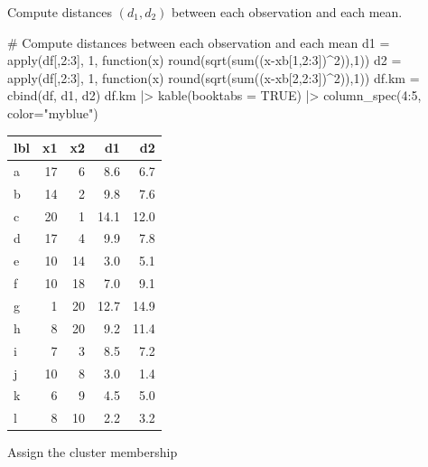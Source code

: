 \documentclass[a4paper]{article}\usepackage[]{graphicx}\usepackage[]{xcolor}
\begin{document}
\hspace{0.02\textwidth}
\begin{minipage}[t]{0.49\textwidth}
Compute distances $(d_1, d_2)$ between each observation and each mean.
\begin{center}
\begin{Schunk}
\begin{Sinput}
# Compute distances between each observation and each mean
d1 = apply(df[,2:3], 1, function(x) round(sqrt(sum((x-xb[1,2:3])^2)),1))
d2 = apply(df[,2:3], 1, function(x) round(sqrt(sum((x-xb[2,2:3])^2)),1))
df.km = cbind(df, d1, d2)
df.km |>
  kable(booktabs = TRUE) |>
  column_spec(4:5, color="myblue")
\end{Sinput}

\begin{tabular}{lrr>{}r>{}r}
\toprule
lbl & x1 & x2 & d1 & d2\\
\midrule
a & 17 & 6 & \textcolor{myblue}{8.6} & \textcolor{myblue}{6.7}\\
b & 14 & 2 & \textcolor{myblue}{9.8} & \textcolor{myblue}{7.6}\\
c & 20 & 1 & \textcolor{myblue}{14.1} & \textcolor{myblue}{12.0}\\
d & 17 & 4 & \textcolor{myblue}{9.9} & \textcolor{myblue}{7.8}\\
e & 10 & 14 & \textcolor{myblue}{3.0} & \textcolor{myblue}{5.1}\\
\addlinespace
f & 10 & 18 & \textcolor{myblue}{7.0} & \textcolor{myblue}{9.1}\\
g & 1 & 20 & \textcolor{myblue}{12.7} & \textcolor{myblue}{14.9}\\
h & 8 & 20 & \textcolor{myblue}{9.2} & \textcolor{myblue}{11.4}\\
i & 7 & 3 & \textcolor{myblue}{8.5} & \textcolor{myblue}{7.2}\\
j & 10 & 8 & \textcolor{myblue}{3.0} & \textcolor{myblue}{1.4}\\
\addlinespace
k & 6 & 9 & \textcolor{myblue}{4.5} & \textcolor{myblue}{5.0}\\
l & 8 & 10 & \textcolor{myblue}{2.2} & \textcolor{myblue}{3.2}\\
\bottomrule
\end{tabular}

\end{Schunk}
\end{center}
\end{minipage}
Assign the cluster membership\\
\end{document}
